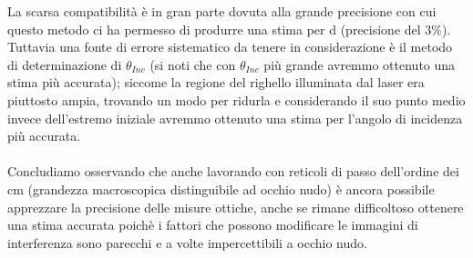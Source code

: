 \documentclass{article}
\theoremstyle{definition}
\begin{document}
\noindent La scarsa compatibilità è in gran parte dovuta alla grande precisione con cui questo metodo ci ha permesso di produrre una stima per d (precisione del 3\%). Tuttavia una fonte di errore sistematico da tenere in considerazione è il metodo di determinazione di \(\theta_{Inc}\) (si  noti che con \(\theta_{Inc}\) più grande avremmo ottenuto una stima più accurata); siccome la regione del righello illuminata dal laser era piuttosto ampia, trovando un modo per ridurla e considerando il suo punto medio invece dell'estremo iniziale avremmo ottenuto una stima per l'angolo di incidenza più accurata.\\\\
Concludiamo osservando che anche lavorando con reticoli di passo dell'ordine dei cm (grandezza macroscopica distinguibile ad occhio nudo) è ancora possibile apprezzare la precisione delle misure ottiche, anche se rimane difficoltoso ottenere una stima accurata poichè i fattori che possono modificare le immagini di interferenza sono parecchi e a volte impercettibili a occhio nudo.
\end{document}
